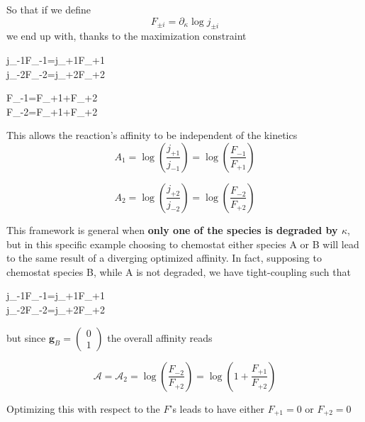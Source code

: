 \documentclass{article}
\begin{document}
	So that if we define $$F_{\pm i}= \partial_{\kappa} \log j_{\pm i}$$ we end up with, thanks to the maximization constraint
	
	
	\hfill \break
	
	\begin{minipage}{0.5\textwidth}
		\begin{cases}
			j_{-1}F_{-1}=j_{+1}F_{+1}\\
			j_{-2}F_{-2}=j_{+2}F_{+2}
			
		\end{cases}
	\end{minipage}
	\begin{minipage}{0.5\textwidth}
		
		\begin{cases}
			F_{-1}=F_{+1}+F_{+2}\\
			F_{-2}=F_{+1}+F_{+2} 
			
		\end{cases}
	\end{minipage}
	\hfill \break
	
	This allows the reaction's affinity to be independent of the kinetics $$
	A_1=\log \left( \frac{j_{+1}}{j_{-1}} \right)=\log \left( \frac{F_{-1}}{F_{+1}} \right)$$
	
	$$
	A_2=\log \left( \frac{j_{+2}}{j_{-2}} \right)=\log \left( \frac{F_{-2}}{F_{+2}} \right)$$
	
	This framework is general when \textbf{only one of the species is degraded by $\kappa$}, but in this specific example choosing to chemostat either species A or B will lead to the same result of a diverging optimized affinity. In fact, supposing to chemostat species B, while A is not degraded, we have tight-coupling such that
	
	\begin{center}
		\begin{cases}
			j_{-1}F_{-1}=j_{+1}F_{+1}\\
			j_{-2}F_{-2}=j_{+2}F_{+2}         
		\end{cases}
	\end{center}
	
	but since $\mathbf{g}_B= \begin{pmatrix}
		0 \\
		1
	\end{pmatrix}$ the overall affinity reads
	
	$$\mathcal{A}=\mathcal{A}_2=\log \left( \frac{F_{-2}}{F_{+2}} \right)=\log \left( 1+\frac{F_{+1}}{F_{+2}} \right)$$
	
	Optimizing this with respect to the $F$'s leads to have either $F_{+1}=0$ or $F_{+2}=0$
	
\end{document}
